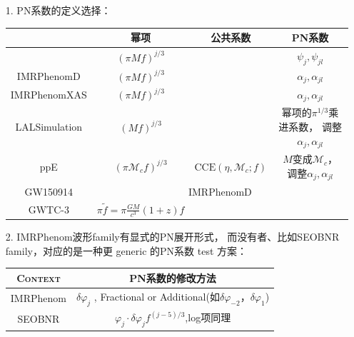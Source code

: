 \documentclass[CJK]{paper}  %
\begin{document}
\begin{itemize}
	\item[1. ] PN系数的定义选择：

	\begin{table}[h!]
		\begin{center}
			\begin{tabular}{|c|c|c|c|}
				\hline
				\diagbox{} & 幂项 & 公共系数 & PN系数 \\
				\hline
				\cite{reexpress_pn_3} & $(\pi Mf)^{j/3}$ & & $\psi_j,\psi_{jl}$ \\
				\hline
				IMRPhenomD & $(\pi Mf)^{j/3}$ & & $\alpha_j,\alpha_{jl}$\\
				\hline
				IMRPhenomXAS & $(\pi Mf)^{j/3}$ & & $\alpha_j,\alpha_{jl}$\\
				\hline
				LALSimulation & $(Mf)^{j/3}$ & & \makecell{幂项的$\pi^{1/3}$乘进系数，\\ 调整$\alpha_j,\alpha_{jl}$} \\
				\hline
				ppE\cite{ppE} & $(\pi\mathcal{M}_c f)^{j/3}$ & $\text{CCE}(\eta,\mathcal{M}_c;f)$ & \makecell{$M$变成$\mathcal{M}_c$，\\ 调整$\alpha_j,\alpha_{jl}$} \\
				\hline
				GW150914 \cite{test_GR_GW150914} & \multicolumn{3}{|c|}{IMRPhenomD} \\
				\hline
				GWTC-3 \cite{test_GR_GWTC3} & $\pi \tilde{f} = \pi \frac{GM}{c^3}(1+z)f$ & & \\
				\hline
			\end{tabular}
		\end{center}
	\end{table}
	\item[2. ] IMRPhenom波形family有显式的PN展开形式，
			而没有者、比如SEOBNR family，对应的是一种更 generic 的PN系数 test 方案：
	\begin{table}[h]
		\begin{center}
			\begin{tabular}{|c|c|}
				\hline
				\textsc{Context} & PN系数的修改方法 \\
				\hline
				IMRPhenom & $\delta\varphi_j$  , Fractional or Additional(如$\delta\varphi_{-2}$，$\delta\varphi_1$) \\
				\hline
				SEOBNR & $\varphi_j \cdot \delta\varphi_j f^{(j-5)/3}$,log项同理\cite{test_GR_GW170817}\\
				\hline
			\end{tabular}
		\end{center}
	\end{table}

\end{itemize}
\end{document}
